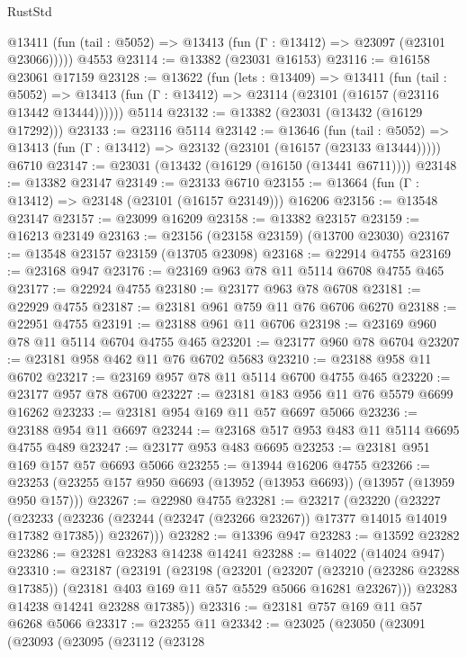 \begin{lexlean}{RustStd}
\begin{coremodule}
      @13411 (fun (tail : @5052) => @13413 (fun (Γ : @13412) => @23097 (@23101 @23066)))))
    @4553
@23114 := @13382 (@23031 @16153)
@23116 := @16158 @23061 @17159
@23128 := @13622
    (fun (lets : @13409) =>
    @13411
      (fun (tail : @5052) =>
      @13413 (fun (Γ : @13412) => @23114 (@23101 (@16157 (@23116 @13442 @13444))))))
    @5114
@23132 := @13382 (@23031 (@13432 (@16129 @17292)))
@23133 := @23116 @5114
@23142 := @13646
    (fun (tail : @5052) => @13413 (fun (Γ : @13412) => @23132 (@23101 (@16157 (@23133 @13444)))))
    @6710
@23147 := @23031 (@13432 (@16129 (@16150 (@13441 @6711))))
@23148 := @13382 @23147
@23149 := @23133 @6710
@23155 := @13664 (fun (Γ : @13412) => @23148 (@23101 (@16157 @23149))) @16206
@23156 := @13548 @23147
@23157 := @23099 @16209
@23158 := @13382 @23157
@23159 := @16213 @23149
@23163 := @23156 (@23158 @23159) (@13700 @23030)
@23167 := @13548 @23157 @23159 (@13705 @23098)
@23168 := @22914 @4755
@23169 := @23168 @947
@23176 := @23169 @963 @78 @11 @5114 @6708 @4755 @465
@23177 := @22924 @4755
@23180 := @23177 @963 @78 @6708
@23181 := @22929 @4755
@23187 := @23181 @961 @759 @11 @76 @6706 @6270
@23188 := @22951 @4755
@23191 := @23188 @961 @11 @6706
@23198 := @23169 @960 @78 @11 @5114 @6704 @4755 @465
@23201 := @23177 @960 @78 @6704
@23207 := @23181 @958 @462 @11 @76 @6702 @5683
@23210 := @23188 @958 @11 @6702
@23217 := @23169 @957 @78 @11 @5114 @6700 @4755 @465
@23220 := @23177 @957 @78 @6700
@23227 := @23181 @183 @956 @11 @76 @5579 @6699 @16262
@23233 := @23181 @954 @169 @11 @57 @6697 @5066
@23236 := @23188 @954 @11 @6697
@23244 := @23168 @517 @953 @483 @11 @5114 @6695 @4755 @489
@23247 := @23177 @953 @483 @6695
@23253 := @23181 @951 @169 @157 @57 @6693 @5066
@23255 := @13944 @16206 @4755
@23266 := @23253 (@23255 @157 @950 @6693 (@13952 (@13953 @6693)) (@13957 (@13959 @950 @157)))
@23267 := @22980 @4755
@23281 := @23217
    (@23220
      (@23227
        (@23233
          (@23236 (@23244 (@23247 (@23266 @23267)) @17377 @14015 @14019 @17382 @17385))
          @23267)))
@23282 := @13396 @947
@23283 := @13592 @23282
@23286 := @23281 @23283 @14238 @14241
@23288 := @14022 (@14024 @947)
@23310 := @23187
    (@23191
      (@23198
        (@23201
          (@23207
            (@23210 (@23286 @23288 @17385))
            (@23181 @403 @169 @11 @57 @5529 @5066 @16281 @23267)))
        @23283
        @14238
        @14241
        @23288
        @17385))
@23316 := @23181 @757 @169 @11 @57 @6268 @5066
@23317 := @23255 @11
@23342 := @23025
    (@23050
      (@23091
        (@23093
          (@23095
            (@23112
              (@23128

\end{coremodule}
\end{lexlean}
